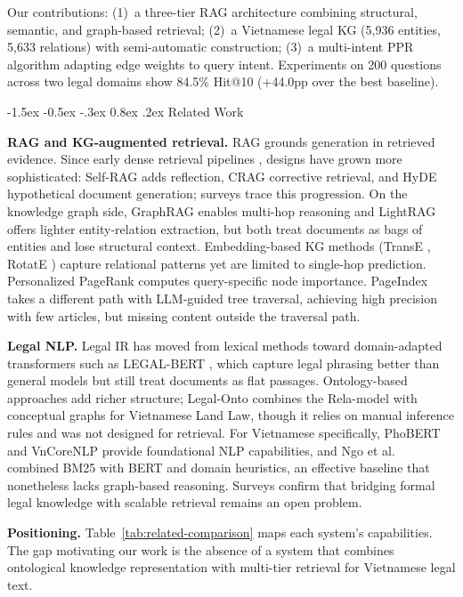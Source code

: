 \documentclass{IOS-Book-Article}
\makeatletter
\renewcommand\section{\@startsection{section}{1}{\z@}%
  {-1.5ex \@plus -0.5ex \@minus -.3ex}%
  {0.8ex \@plus .2ex}%
  {\normalfont\large\bfseries}}
\makeatother
\begin{document}
Our contributions: (1)~a three-tier RAG architecture combining structural, semantic, and graph-based retrieval; (2)~a Vietnamese legal KG (5,936 entities, 5,633 relations) with semi-automatic construction; (3)~a multi-intent PPR algorithm adapting edge weights to query intent. Experiments on 200 questions across two legal domains show 84.5\% Hit@10 (+44.0pp over the best baseline).

\section{Related Work}
\label{sec:related}

\textbf{RAG and KG-augmented retrieval.}
RAG \cite{r1} grounds generation in retrieved evidence. Since early dense retrieval pipelines \cite{r10}, designs have grown more sophisticated: Self-RAG \cite{r11} adds reflection, CRAG \cite{r12} corrective retrieval, and HyDE \cite{r13} hypothetical document generation; surveys \cite{r3,r4} trace this progression. On the knowledge graph side, GraphRAG \cite{r6} enables multi-hop reasoning and LightRAG \cite{r5} offers lighter entity-relation extraction, but both treat documents as bags of entities and lose structural context. Embedding-based KG methods (TransE \cite{r14}, RotatE \cite{r15}) capture relational patterns yet are limited to single-hop prediction. Personalized PageRank \cite{r16,r17} computes query-specific node importance. PageIndex \cite{r7} takes a different path with LLM-guided tree traversal, achieving high precision with few articles, but missing content outside the traversal path.

\textbf{Legal NLP.}
Legal IR has moved from lexical methods \cite{r18,r19} toward domain-adapted transformers such as LEGAL-BERT \cite{r20}, which capture legal phrasing better than general models but still treat documents as flat passages. Ontology-based approaches \cite{r9} add richer structure; Legal-Onto \cite{r8} combines the Rela-model \cite{r21} with conceptual graphs for Vietnamese Land Law, though it relies on manual inference rules and was not designed for retrieval. For Vietnamese specifically, PhoBERT \cite{r22} and VnCoreNLP \cite{r23} provide foundational NLP capabilities, and Ngo et al.\ \cite{r24} combined BM25 with BERT \cite{r25} and domain heuristics, an effective baseline that nonetheless lacks graph-based reasoning. Surveys \cite{r26,r27} confirm that bridging formal legal knowledge with scalable retrieval remains an open problem.

\textbf{Positioning.}
Table~\ref{tab:related-comparison} maps each system's capabilities. The gap motivating our work is the absence of a system that combines ontological knowledge representation with multi-tier retrieval for Vietnamese legal text.
\end{document}
